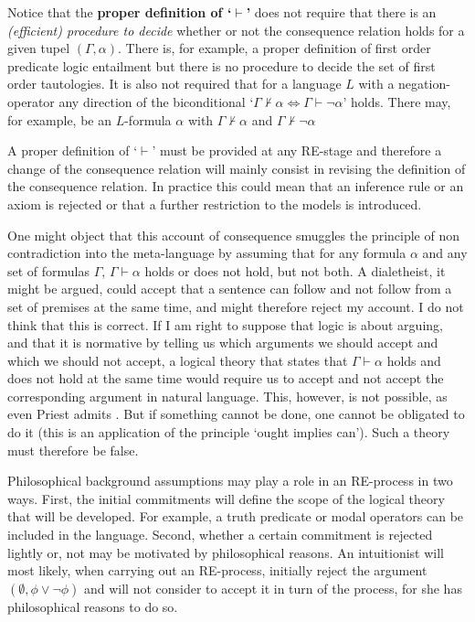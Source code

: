 \documentclass{article}
\begin{document}
Notice that the \textbf{proper definition of `$\vdash$'} does not require that there is an \textit{(efficient) procedure to decide} whether or not the consequence relation holds for a given tupel $(\Gamma,\alpha)$. There is, for example, a proper definition of first order predicate logic entailment but there is no procedure to decide the set of first order tautologies. It is also not required that for a language $L$ with a negation-operator any direction of the biconditional `$\Gamma\nvdash\alpha\Leftrightarrow\Gamma\vdash\neg\alpha$' holds. There may, for example, be an $L$-formula $\alpha$ with $\Gamma\nvdash\alpha$ and $\Gamma\nvdash\neg\alpha$

A proper definition of `$\vdash$' must be provided at any RE-stage and therefore a change of the consequence relation will mainly consist in revising the definition of the consequence relation. In practice this could mean that an inference rule or an axiom is rejected or that a further restriction to the models is introduced.

One might object that this account of consequence smuggles the principle of non contradiction into the meta-language by assuming that for any formula $\alpha$ and any set of formulas $\Gamma$, $\Gamma\vdash\alpha$ holds or does not hold, but not both. A dialetheist, it might be argued, could accept that a sentence can follow and not follow from a set of premises at the same time, and might therefore reject my account. I do not think that this is correct. If I am right to suppose that logic is about arguing, and that it is normative by telling us which arguments we should accept and which we should not accept, a logical theory that states that $\Gamma\vdash\alpha$ holds and does not hold at the same time would require us to accept and not accept the corresponding argument in natural language. This, however, is not possible, as even Priest admits \cite[p.~618]{priest1}. But if something cannot be done, one cannot be obligated to do it (this is an application of the principle `ought implies can'). Such a theory must therefore be false.

Philosophical background assumptions may play a role in an RE-process in two ways. First, the initial commitments will define the scope of the logical theory that will be developed. For example, a truth predicate or modal operators can be included in the language. Second, whether a certain commitment is rejected lightly or, not may be motivated by philosophical reasons. An intuitionist will most likely, when carrying out an RE-process, initially reject the argument $(\emptyset,\phi\vee\neg\phi)$ and will not consider to accept it in turn of the process, for she has philosophical reasons to do so. %
\end{document}
